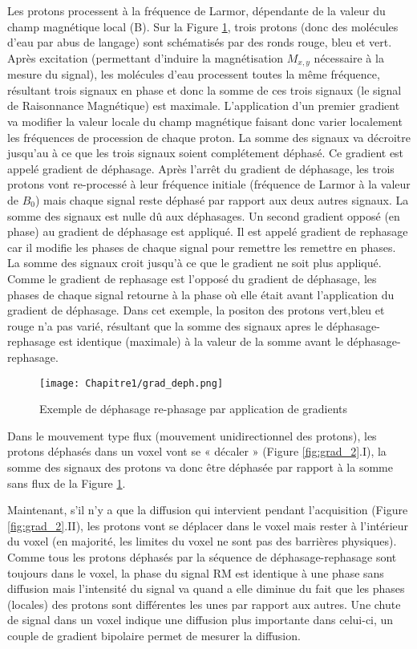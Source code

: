 Les protons processent à la fréquence de Larmor, dépendante de la valeur du champ magnétique local (B). Sur la Figure \ref{fig:grad_1}, trois protons (donc des molécules d’eau par abus de langage) sont schématisés par des ronds rouge, bleu et vert. Après excitation (permettant d’induire la magnétisation $M_{x,y}$ nécessaire à la mesure du signal), les molécules d’eau processent toutes la même fréquence, résultant trois signaux en phase et donc la somme de ces trois signaux (le signal de Raisonnance Magnétique) est maximale.
L’application d’un premier gradient va modifier la valeur locale du champ magnétique faisant donc varier localement les fréquences de procession de chaque proton. La somme des signaux va décroitre jusqu’au à ce que les trois signaux soient complétement déphasé. Ce gradient est appelé gradient de déphasage.
Après l’arrêt du gradient de déphasage, les trois protons vont re-processé à leur fréquence initiale (fréquence de Larmor à la valeur de $B_0$) mais chaque signal reste déphasé par rapport aux deux autres signaux. La somme des signaux est nulle dû aux déphasages.
Un second gradient opposé (en phase) au gradient de déphasage est appliqué. Il est appelé gradient de rephasage car il modifie les phases de chaque signal pour remettre les remettre en phases. La somme des signaux croit jusqu’à ce que le gradient ne soit plus appliqué. Comme le gradient de rephasage est l’opposé du gradient de déphasage, les phases de chaque signal retourne à la phase où elle était avant l’application du gradient de déphasage.
Dans cet exemple, la positon des protons vert,bleu et rouge n'a pas varié, résultant que la somme des signaux apres le déphasage-rephasage est identique (maximale) à la valeur de la somme avant le déphasage-rephasage.
\begin{figure}[!htbp]
  \begin{center}
    \texttt{[image: Chapitre1/grad\_deph.png]}
     \end{center}
    \caption{Exemple de déphasage re-phasage par application de gradients \cite{2014}}
  \label{fig:grad_1}
\end{figure}
\clearpage
Dans le mouvement type flux (mouvement unidirectionnel des protons), les protons déphasés dans un voxel vont se « décaler » (Figure \ref{fig:grad_2}.I), la somme des signaux des protons va donc être déphasée par rapport à la somme sans flux de la Figure \ref{fig:grad_1}.

Maintenant, s’il n’y a que la diffusion qui intervient pendant l’acquisition (Figure \ref{fig:grad_2}.II), les protons vont se déplacer dans le voxel mais rester à l’intérieur du voxel (en majorité, les limites du voxel ne sont pas des barrières physiques). Comme tous les protons déphasés par la séquence de déphasage-rephasage sont toujours dans le voxel, la phase du signal RM est identique à une phase sans diffusion mais l’intensité du signal va quand a elle diminue du fait que les phases (locales) des protons sont différentes les unes par rapport aux autres. Une chute de signal dans un voxel indique une diffusion plus importante dans celui-ci, un couple de gradient bipolaire permet de mesurer la diffusion.

